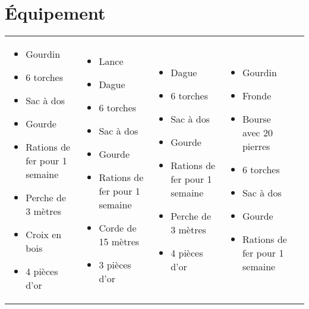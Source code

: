 \chapter{\'Equipement}

\begin{tabularx}{\textwidth}{|X|X|X|X|X|}
  \hline
  \begin{itemize}
    \item Gourdin
    \item 6 torches
    \item Sac à dos
    \item Gourde
    \item Rations de fer pour 1 semaine
    \item Perche de 3 mètres
    \item Croix en bois
    \item 4 pièces d'or
  \end{itemize}
  &
  \begin{itemize}
    \item Lance
    \item Dague
    \item 6 torches
    \item Sac à dos
    \item Gourde
    \item Rations de fer pour 1 semaine
    \item Corde de 15 mètres
    \item 3 pièces d'or
  \end{itemize}
  &
  \begin{itemize}
    \item Dague
    \item 6 torches
    \item Sac à dos
    \item Gourde
    \item Rations de fer pour 1 semaine
    \item Perche de 3 mètres
    \item 4 pièces d'or
  \end{itemize}
  &
  \begin{itemize}
    \item Gourdin
    \item Fronde
    \item Bourse avec 20 pierres
    \item 6 torches
    \item Sac à dos
    \item Gourde
    \item Rations de fer pour 1 semaine

\end{itemize}
\end{tabularx}
